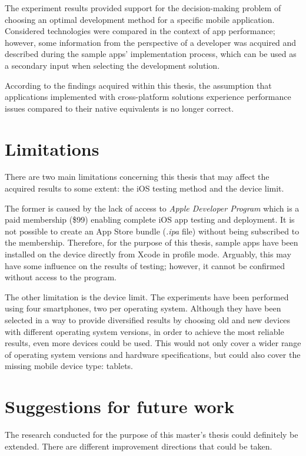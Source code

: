 The experiment results provided support for the decision-making problem of choosing an optimal development method for a specific mobile application. Considered technologies were compared in the context of app performance; however, some information from the perspective of a developer was acquired and described during the sample apps' implementation process, which can be used as a secondary input when selecting the development solution.

According to the findings acquired within this thesis, the assumption that applications implemented with cross-platform solutions experience performance issues compared to their native equivalents is no longer correct.

\section{Limitations}

There are two main limitations concerning this thesis that may affect the acquired results to some extent: the iOS testing method and the device limit.

The former is caused by the lack of access to \emph{Apple Developer Program} which is a paid membership (\$99) enabling complete iOS app testing and deployment. It is not possible to create an App Store bundle (\emph{.ipa} file) without being subscribed to the membership. Therefore, for the purpose of this thesis, sample apps have been installed on the device directly from Xcode in profile mode. Arguably, this may have some influence on the results of testing; however, it cannot be confirmed without access to the program.

The other limitation is the device limit. The experiments have been performed using four smartphones, two per operating system. Although they have been selected in a way to provide diversified results by choosing old and new devices with different operating system versions, in order to achieve the most reliable results, even more devices could be used. This would not only cover a wider range of operating system versions and hardware specifications, but could also cover the missing mobile device type: tablets.

\section{Suggestions for future work}

The research conducted for the purpose of this master's thesis could definitely be extended. There are different improvement directions that could be taken.

